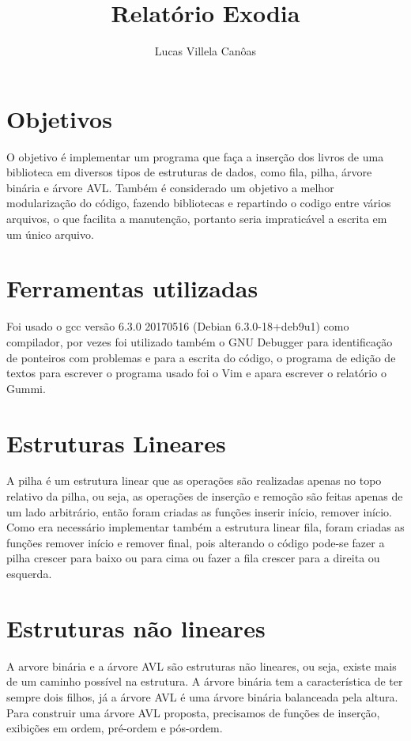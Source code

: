 \documentclass[11pt]{article}
\title{\textbf{Relatório Exodia}}
\author{Lucas Villela Canôas}
\date{}
\begin{document}
\maketitle

\section{Objetivos}

O objetivo é implementar um programa que faça a inserção dos livros de uma biblioteca em diversos tipos de estruturas de dados, como fila, pilha, árvore binária e árvore AVL.
Também é considerado um objetivo a melhor modularização do código, fazendo bibliotecas e repartindo o codigo entre vários arquivos, o que facilita a manutenção, portanto seria impraticável a escrita em um único arquivo.

\section {Ferramentas utilizadas}

Foi usado o gcc versão 6.3.0 20170516 (Debian 6.3.0-18+deb9u1) como compilador, por vezes foi utilizado também o GNU Debugger para identificação de ponteiros com problemas e para a escrita do código, o programa de edição de textos para escrever o programa usado foi o Vim e apara escrever o relatório o Gummi.


\section {Estruturas Lineares}

A pilha é um estrutura linear que as operações são realizadas apenas no topo relativo da pilha, ou seja, as operações de inserção e remoção são feitas apenas de um lado arbitrário, então foram criadas as funções inserir início, remover início. Como era necessário implementar também a estrutura linear fila, foram criadas as funções remover início e remover final, pois alterando o código pode-se fazer a pilha crescer para baixo ou para cima ou fazer a fila crescer para a direita ou esquerda.

\section {Estruturas não lineares}

A arvore binária e a árvore AVL são estruturas não lineares, ou seja, existe mais de um caminho possível na estrutura. A árvore binária tem a característica de ter sempre dois filhos, já a árvore AVL é uma árvore binária balanceada pela altura. Para construir uma árvore AVL proposta, precisamos de funções de inserção, exibições em ordem, pré-ordem e pós-ordem.
\end{document}
